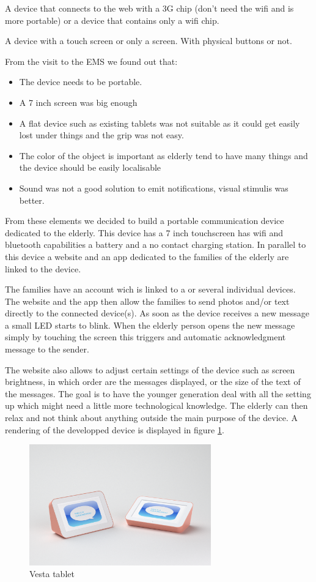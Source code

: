 A device that connects to the web with a 3G chip (don’t need the wifi and is more portable) or a device that contains only a wifi chip.

A device with a touch screen or only a screen. With physical buttons or not.

From the visit to the EMS we found out that:
\begin{itemize}
  \item{ The device needs to be portable. }
  \item{ A 7 inch screen was big enough }
  \item{ A flat device such as existing tablets was not suitable as it could get easily lost under things and the grip was not easy.}
  \item{ The color of the object is important as elderly tend to have many things and the device should be easily localisable}
  \item{ Sound was not a good solution to emit notifications, visual stimulis was better.}
\end{itemize}


From these elements we decided to build a portable communication device dedicated to the elderly. This device has a 7 inch touchscreen has wifi and bluetooth
capabilities a battery and a no contact charging station. In parallel to this device a website and an app dedicated to the families of the elderly are linked to the device.

The families have an account wich is linked to a or several individual devices. The website and the app then allow the families to send photos and/or text directly to the connected device(s).
As soon as the device receives a new message a small LED starts to blink. When the elderly person opens the new message simply by touching the screen this triggers and automatic acknowledgment message to the sender.

The website also allows to adjust certain settings of the device such as screen brightness, in which order are the messages displayed, or the size of the text of the messages. The goal is to have the younger generation deal with all the setting up which might need a little more technological knowledge. The elderly can then relax and not think about anything outside the main purpose of the device. A rendering of the developped device is displayed in figure \ref{fig:vesta tablet}.



\begin{figure}
    \centering
    \includegraphics[width=0.7\textwidth,keepaspectratio]{chap/designFig/VisioRender5.png}
    \caption{Vesta tablet}
    \label{fig:vesta tablet}
\end{figure}

